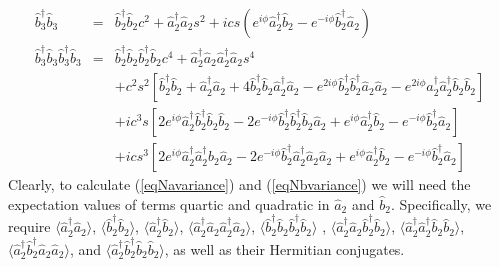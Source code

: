 \documentclass{iopart}
\begin{document}
\begin{eqnarray}
\hat{b}^{\dagger}_3 \hat{b}_3 &=& \hat{b}^{\dagger}_2 \hat{b}_2 c^2 +  \hat{a}^{\dagger}_2 \hat{a}_2 s^2 + i c s ( e^{i \phi} \hat{a}^{\dagger}_2 \hat{b}_2 - e^{-i \phi} \hat{b}^{\dagger}_2 \hat{a}_2) \\
%
%
\hat{b}^{\dagger}_3 \hat{b}_3 \hat{b}^{\dagger}_3 \hat{b}_3 &=& \hat{b}^{\dagger}_2 \hat{b}_2 \hat{b}^{\dagger}_2 \hat{b}_2 c^4 + \hat{a}^{\dagger}_2 \hat{a}_2 \hat{a}^{\dagger}_2 \hat{a}_2 s^4 \nonumber \\
%
&& + c^2 s^2 [ \hat{b}^{\dagger}_2 \hat{b}_2 + \hat{a}^{\dagger}_2 \hat{a}_2 + 4 \hat{b}^{\dagger}_2 \hat{b}_2 \hat{a}^{\dagger}_2 \hat{a}_2 - e^{2 i \phi} \hat{b}^{\dagger}_2 \hat{b}^{\dagger}_2 \hat{a}_2 \hat{a}_2 -e^{2 i \phi} \hat{a}^{\dagger}_2 \hat{a}^{\dagger}_2 \hat{b}_2 \hat{b}_2 ] \nonumber \\
%
&& + i c^3 s [2 e^{i \phi} \hat{a}^{\dagger}_2 \hat{b}^{\dagger}_2 \hat{b}_2 \hat{b}_2 - 2 e^{-i \phi} \hat{b}^{\dagger}_2 \hat{b}^{\dagger}_2 \hat{b}_2 \hat{a}_2 + e^{i \phi} \hat{a}^{\dagger}_2 \hat{b}_2 - e^{-i \phi} \hat{b}^{\dagger}_2 \hat{a}_2 ] \nonumber \\
%
&& + i c s^3 [2 e^{i \phi} \hat{a}^{\dagger}_2 \hat{a}^{\dagger}_2 \hat{b}_2 \hat{a}_2 - 2 e^{-i \phi} \hat{b}^{\dagger}_2 \hat{a}^{\dagger}_2 \hat{a}_2 \hat{a}_2 + e^{i \phi} \hat{a}^{\dagger}_2 \hat{b}_2 - e^{-i \phi} \hat{b}^{\dagger}_2 \hat{a}_2 ] 
\end{eqnarray}
Clearly, to calculate (\ref{eqNavariance}) and (\ref{eqNbvariance}) we will need the expectation values of terms quartic and quadratic in $\hat{a}_2$ and ${\hat{b}_2}$. Specifically, we require $\langle \hat{a}^{\dagger}_2 \hat{a}_2 \rangle$, $\langle \hat{b}^{\dagger}_2 \hat{b}_2 \rangle$,  $\langle \hat{a}^{\dagger}_2 \hat{b}_2 \rangle$, $\langle \hat{a}^{\dagger}_2 \hat{a}_2 \hat{a}^{\dagger}_2 \hat{a}_2 \rangle$, $\langle \hat{b}^{\dagger}_2 \hat{b}_2 \hat{b}^{\dagger}_2 \hat{b}_2 \rangle$ , $\langle \hat{a}^{\dagger}_2 \hat{a}_2 \hat{b}^{\dagger}_2 \hat{b}_2 \rangle$, $\langle \hat{a}^{\dagger}_2 \hat{a}^{\dagger}_2 \hat{b}_2 \hat{b}_2 \rangle$, $\langle \hat{a}^{\dagger}_2 \hat{b}^{\dagger}_2 \hat{a}_2 \hat{a}_2 \rangle$, and $\langle \hat{a}^{\dagger}_2 \hat{b}^{\dagger}_2 \hat{b}_2 \hat{b}_2 \rangle$, as well as their Hermitian conjugates.
\end{document}
